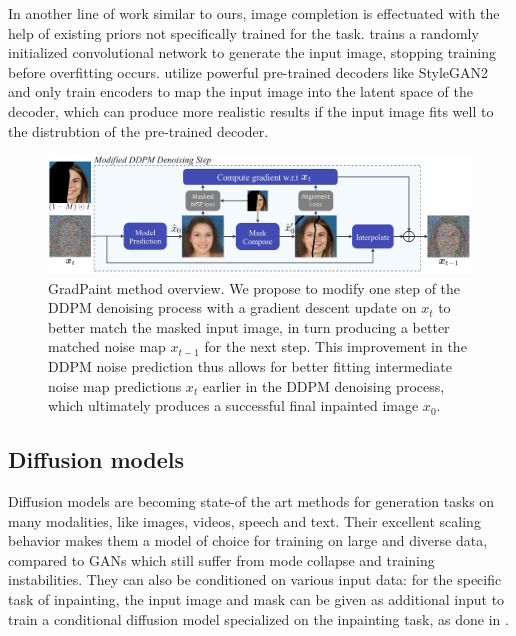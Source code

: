 
In another line of work similar to ours, image completion is effectuated with the 
help of existing priors not specifically trained for the task. \cite{ulyanov2018deep} 
trains a randomly initialized convolutional network to generate the input image, 
stopping training before overfitting occurs. \cite{psp, zhao2021comodgan, glean} 
utilize powerful pre-trained decoders like StyleGAN2\cite{stylegan2} and only train
 encoders to map the input image into the latent space of the decoder, which can produce
  more realistic results if the input image fits well to the distrubtion of the
   pre-trained decoder. 




\begin{figure}[h]
  \centering
    \includegraphics[width=\textwidth]{images/gradpaint/method.pdf}
    \caption{GradPaint method overview. We propose to modify one step of the DDPM denoising process with a gradient descent update on $x_t$ to better match the masked input image, in turn producing a better matched noise map $x_{t-1}$ for the next step. This improvement in the DDPM noise prediction thus allows for better fitting intermediate noise map predictions $x_t$ earlier in the DDPM denoising process, which ultimately produces a successful final inpainted image $x_0$.}
    \label{fig:method}
\end{figure}


\subsection{Diffusion models}

Diffusion models are becoming state-of the art methods for generation tasks on many 
modalities, like images, videos, speech and text. Their excellent scaling behavior makes 
them a model of choice for training on large and diverse data, compared to GANs which 
still suffer from mode collapse and training instabilities. They can also be conditioned
 on various input data: for the specific task of inpainting, the input image and mask 
 can be given as additional input to train a conditional diffusion model specialized on
  the inpainting task, as done in \cite{saharia2022palette}.

